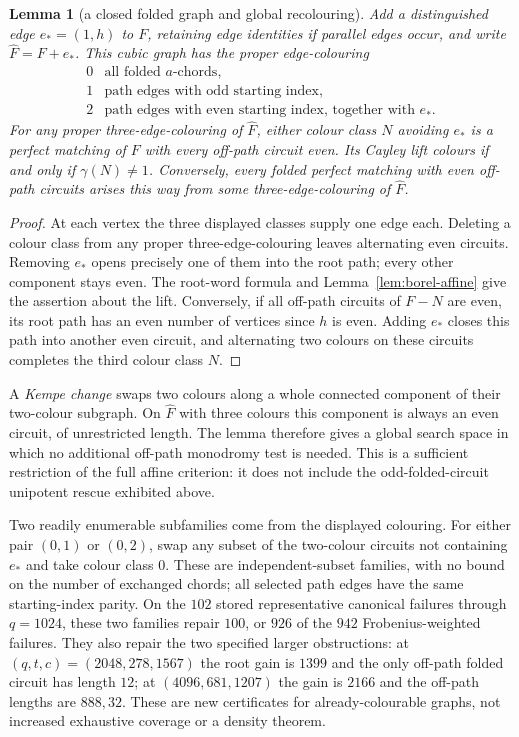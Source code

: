 \documentclass[11pt,a4paper]{article}
\newtheorem{lemma}[theorem]{Lemma}
\theoremstyle{definition}
\theoremstyle{remark}
\begin{document}
\begin{lemma}[a closed folded graph and global recolouring]\label{lem:borel-kempe}
Add a distinguished edge $e_*=(1,h)$ to $F$, retaining edge identities if parallel edges occur, and write $\widehat F=F+e_*$.  This cubic graph has the proper edge-colouring
\[
 \begin{array}{c|l}
 0&\text{all folded $a$-chords},\\
 1&\text{path edges with odd starting index},\\
 2&\text{path edges with even starting index, together with $e_*$}.
 \end{array}
\]
For any proper three-edge-colouring of $\widehat F$, either colour class $N$ avoiding $e_*$ is a perfect matching of $F$ with every off-path circuit even.  Its Cayley lift colours if and only if $\gamma(N)\ne1$.  Conversely, every folded perfect matching with even off-path circuits arises this way from some three-edge-colouring of $\widehat F$.
\end{lemma}
\begin{proof}
At each vertex the three displayed classes supply one edge each.  Deleting a colour class from any proper three-edge-colouring leaves alternating even circuits.  Removing $e_*$ opens precisely one of them into the root path; every other component stays even.  The root-word formula and Lemma~\ref{lem:borel-affine} give the assertion about the lift.  Conversely, if all off-path circuits of $F-N$ are even, its root path has an even number of vertices since $h$ is even.  Adding $e_*$ closes this path into another even circuit, and alternating two colours on these circuits completes the third colour class $N$.
\end{proof}

A \emph{Kempe change} swaps two colours along a whole connected component of their two-colour subgraph.  On $\widehat F$ with three colours this component is always an even circuit, of unrestricted length.  The lemma therefore gives a global search space in which no additional off-path monodromy test is needed.  This is a sufficient restriction of the full affine criterion: it does not include the odd-folded-circuit unipotent rescue exhibited above.

Two readily enumerable subfamilies come from the displayed colouring.  For either pair $(0,1)$ or $(0,2)$, swap any subset of the two-colour circuits not containing $e_*$ and take colour class $0$.  These are independent-subset families, with no bound on the number of exchanged chords; all selected path edges have the same starting-index parity.  On the $102$ stored representative canonical failures through $q=1024$, these two families repair $100$, or $926$ of the $942$ Frobenius-weighted failures.  They also repair the two specified larger obstructions: at $(q,t,c)=(2048,278,1567)$ the root gain is $1399$ and the only off-path folded circuit has length $12$; at $(4096,681,1207)$ the gain is $2166$ and the off-path lengths are $888,32$.  These are new certificates for already-colourable graphs, not increased exhaustive coverage or a density theorem.
\end{document}
